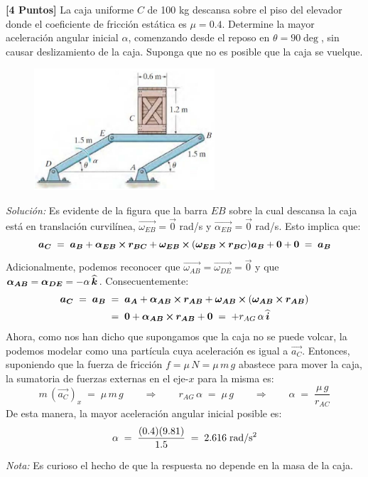 \documentclass[ a4paper, twoside, 11pt]{article}
\begin{document}
\begin{problem}
\textbf{[4 Puntos]} La caja uniforme $C$ de 100 kg descansa sobre el piso del elevador donde el coeficiente de fricci\'on est\'atica es $\mu = 0.4$. Determine la mayor aceleraci\'on angular inicial $\alpha$, comenzando desde el reposo en $\theta = 90\deg$, sin causar deslizamiento de la caja. Suponga que no es posible que la caja se vuelque. 

\begin{figure}[htb]
\centering
\includegraphics[width=0.6\textwidth]{problema-2.jpg}
\end{figure}

\emph{Soluci\'on:} Es evidente de la figura que la barra $EB$ sobre la cual descansa la caja est\'a en translaci\'on curvil\'inea, \ie $\vec{\omega_{EB}} = \vec{0}$ rad/s y $\vec{\alpha_{EB}} = \vec{0}$ rad/s. Esto implica que: 
\[
{\boldsymbol{a_C}} \; = \; {\boldsymbol{a_B}} + {\boldsymbol{\alpha_{EB}}} \,{\boldsymbol{\times}}\, {\boldsymbol{r_{BC}}} + {\boldsymbol{\omega_{EB}}} \,{\boldsymbol{\times}}\, ( {\boldsymbol{\omega_{EB}}} \,{\boldsymbol{\times}}\, {\boldsymbol{r_{BC}}} ) \\
{\boldsymbol{a_B}} + {\boldsymbol{0}} + {\boldsymbol{0}} \; = \; {\boldsymbol{a_B}}
\]
Adicionalmente, podemos reconocer que $\vec{\omega_{AB}} = \vec{\omega_{DE}} = \vec{0}$ y que ${\boldsymbol{\alpha_{AB}}} = {\boldsymbol{\alpha_{DE}}} = -\alpha \, {\boldsymbol{\widehat{k}}}$. Consecuentemente: 
\begin{align*}
{\boldsymbol{a_C}} \; = \; {\boldsymbol{a_B}} \;
& = \; {\boldsymbol{a_A}} + {\boldsymbol{\alpha_{AB}}} \,{\boldsymbol{\times}}\, {\boldsymbol{r_{AB}}} + {\boldsymbol{\omega_{AB}}} \,{\boldsymbol{\times}}\, ( {\boldsymbol{\omega_{AB}}} \,{\boldsymbol{\times}}\, {\boldsymbol{r_{AB}}} ) \\
& = \; {\boldsymbol{0}} + {\boldsymbol{\alpha_{AB}}} \,{\boldsymbol{\times}}\, {\boldsymbol{r_{AB}}} + {\boldsymbol{0}}
\; = \; +r_{AG} \, \alpha \, {\boldsymbol{\widehat{i}}}
\end{align*}
Ahora, como nos han dicho que supongamos que la caja no se puede volcar, la podemos modelar como una part\'icula cuya aceleraci\'on es igual a $\vec{a_C}$. Entonces, suponiendo que la fuerza de fricci\'on $f = \mu \, N = \mu \, m \, g$ abastece para mover la caja, la sumatoria de fuerzas externas en el eje-$x$ para la misma es: 
\[
m \, (\vec{a_C})_x \; = \; \mu \, m \, g
\qquad  \Longrightarrow \qquad
r_{AG} \, \alpha \; = \; \mu \, g
\qquad  \Longrightarrow \qquad
\alpha \; = \; \frac{\mu \, g}{r_{AC}}
\]
De esta manera, la mayor aceleraci\'on angular inicial posible es:
\[
\alpha \; = \; \frac{(0.4)(9.81)}{1.5}
\; = \; 2.616 \; \text{rad/s\ensuremath{^{\text{2}}}}
\]

\emph{Nota:} Es curioso el hecho de que la respuesta no depende en la masa de la caja. 

\QED

\end{problem}
\fullskip
\end{document}
